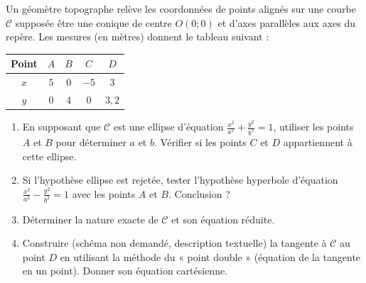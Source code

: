 \documentclass[11pt]{article}
\begin{document}
\begin{exercice}
Un géomètre topographe relève les coordonnées de points alignés sur une courbe $\mathcal{C}$ supposée être une conique de centre $O(0;0)$ et d'axes parallèles aux axes du repère. Les mesures (en mètres) donnent le tableau suivant :
\begin{center}
\begin{tabular}{|c|c|c|c|c|}
\hline
Point & $A$ & $B$ & $C$ & $D$ \\
\hline
$x$ & $5$ & $0$ & $-5$ & $3$ \\
\hline
$y$ & $0$ & $4$ & $0$ & $3,2$ \\
\hline
\end{tabular}
\end{center}
\begin{enumerate}
    \item En supposant que $\mathcal{C}$ est une ellipse d'équation $\frac{x^2}{a^2}+\frac{y^2}{b^2}=1$, utiliser les points $A$ et $B$ pour déterminer $a$ et $b$. Vérifier si les points $C$ et $D$ appartiennent à cette ellipse.
    \item Si l'hypothèse ellipse est rejetée, tester l'hypothèse hyperbole d'équation $\frac{x^2}{a^2}-\frac{y^2}{b^2}=1$ avec les points $A$ et $B$. Conclusion ?
    \item Déterminer la nature exacte de $\mathcal{C}$ et son équation réduite.
    \item Construire (schéma non demandé, description textuelle) la tangente à $\mathcal{C}$ au point $D$ en utilisant la méthode du « point double » (équation de la tangente en un point). Donner son équation cartésienne.
\end{enumerate}
\end{exercice}
\end{document}
